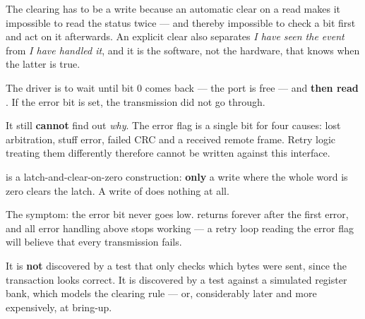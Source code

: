 The clearing has to be a write because an automatic clear on a read makes it impossible to read
the status twice --- and thereby impossible to check a bit first and act on it afterwards. An
explicit clear also separates \emph{I have seen the event} from \emph{I have handled it}, and it
is the software, not the hardware, that knows when the latter is true.

 The driver is to wait until  bit 0 comes back --- the port is free --- and
\textbf{then read }. If the error bit is set, the transmission did not go
through.

It still \textbf{cannot} find out \emph{why}. The error flag is a single bit for four causes: lost
arbitration, stuff error, failed CRC and a received remote frame. Retry logic treating them
differently therefore cannot be written against this interface.

  is a latch-and-clear-on-zero construction: \textbf{only} a write where
the whole word is zero clears the latch. A write of  does nothing at all.

The symptom: the error bit never goes low.  returns  forever after the
first error, and all error handling above stops working --- a retry loop reading the error flag
will believe that every transmission fails.

It is \textbf{not} discovered by a test that only checks which bytes were sent, since the
transaction looks correct. It is discovered by a test against a simulated register bank, which
models the clearing rule --- or, considerably later and more expensively, at bring-up.
